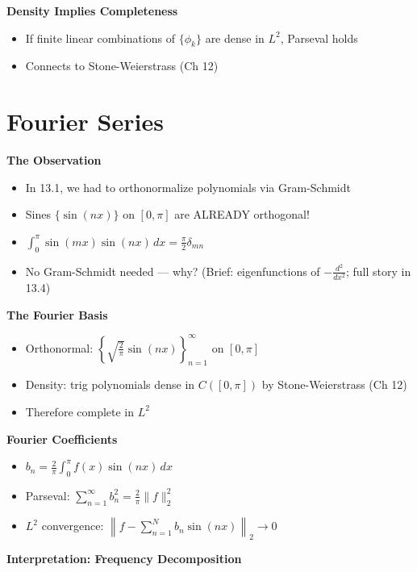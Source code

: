 \documentclass[
  10pt,
  letterpaper,
]{scrbook}
\providecommand{\tightlist}{%
  \setlength{\itemsep}{0pt}\setlength{\parskip}{0pt}}
\begin{document}
\textbf{Density Implies Completeness}

\begin{itemize}
\tightlist
\item
  If finite linear combinations of \(\{\phi_k\}\) are dense in \(L^2\),
  Parseval holds
\item
  Connects to Stone-Weierstrass (Ch 12)
\end{itemize}

\section{Fourier Series}\label{fourier-series-1}

\textbf{The Observation}

\begin{itemize}
\tightlist
\item
  In 13.1, we had to orthonormalize polynomials via Gram-Schmidt
\item
  Sines \(\{\sin(nx)\}\) on \([0, \pi]\) are ALREADY orthogonal!
\item
  \(\int_0^\pi \sin(mx)\sin(nx)\, dx = \frac{\pi}{2}\delta_{mn}\)
\item
  No Gram-Schmidt needed --- why? (Brief: eigenfunctions of
  \(-\frac{d^2}{dx^2}\); full story in 13.4)
\end{itemize}

\textbf{The Fourier Basis}

\begin{itemize}
\tightlist
\item
  Orthonormal:
  \(\left\{\sqrt{\frac{2}{\pi}}\sin(nx)\right\}_{n=1}^\infty\) on
  \([0, \pi]\)
\item
  Density: trig polynomials dense in \(C([0,\pi])\) by Stone-Weierstrass
  (Ch 12)
\item
  Therefore complete in \(L^2\)
\end{itemize}

\textbf{Fourier Coefficients}

\begin{itemize}
\tightlist
\item
  \(b_n = \frac{2}{\pi}\int_0^\pi f(x)\sin(nx)\, dx\)
\item
  Parseval: \(\sum_{n=1}^\infty b_n^2 = \frac{2}{\pi}\|f\|_2^2\)
\item
  \(L^2\) convergence:
  \(\left\|f - \sum_{n=1}^N b_n\sin(nx)\right\|_2 \to 0\)
\end{itemize}

\textbf{Interpretation: Frequency Decomposition}
\end{document}
